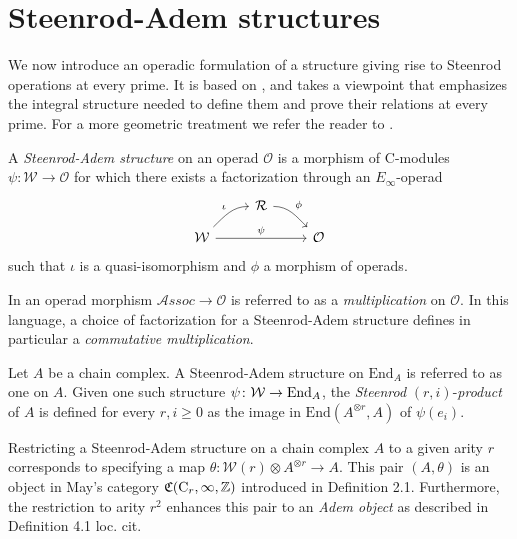 
\section{Steenrod-Adem structures}

We now introduce an operadic formulation of a structure giving rise to Steenrod operations at every prime. It is based on \cites{steenrod47products, steenrod53symmetric, steenrod53cyclic, may70generalapproach}, and takes a viewpoint that emphasizes the integral structure needed to define them and prove their relations at every prime. For a more geometric treatment we refer the reader to \cites{may72geometry, may76homology, lawson2020n}.

\begin{definition} \label{def: Steenrod-Adem structure}
	A \textit{Steenrod-Adem structure} on an operad $\mathcal O$ is a 
	morphism of $\mathrm{C}$-modules $\psi \colon \mathcal W \to \mathcal O$ for which there exists a factorization through an $E_\infty$-operad
	\begin{equation*}
	\begin{tikzcd}[column sep = normal, row sep = small]
	& \mathcal R \arrow[dr, "\phi", out=0] & \\
	\mathcal W \arrow[ur, "\iota", in=180] \arrow[rr, "\psi"] & & \mathcal O
	\end{tikzcd}
	\end{equation*}
	such that $\iota$ is a quasi-isomorphism and $\phi$ a morphism of operads.
\end{definition}

\begin{remark} \label{rmk: Deligne conjecture}
	In \cite{GerstenhaberVoronov} an operad morphism $\mathcal{A}ssoc \to \mathcal O$ is referred to as a \textit{multiplication} on $\mathcal O$. In this language, a choice of factorization for a Steenrod-Adem structure defines in particular a \textit{commutative multiplication}.
\end{remark}

\begin{definition}
	Let $A$ be a chain complex. A Steenrod-Adem structure on $\mathrm{End}_A$ is referred to as one on $A$. Given one such structure $\psi \colon \mathcal W \to \mathrm{End}_A$, the \textit{Steenrod} $(r, i)$-\textit{product} of $A$ is defined for every $r, i \geq 0$ as the image in $ \mathrm{End}(A^{\otimes r}, A)$ of $\psi(e_i)$.
\end{definition}

\begin{remark}
	Restricting a Steenrod-Adem structure on a chain complex $A$ to a given arity $r$ corresponds to specifying a map $\theta \colon \mathcal W(r) \otimes A^{\otimes r} \to A$. This pair $(A, \theta)$ is an object in May's category $\mathfrak{C}(\mathrm C_r, \infty, \mathbb{Z})$ introduced in \cite{may70generalapproach} Definition 2.1. Furthermore, the restriction to arity $r^2$ enhances this pair to an \textit{Adem object} as described in Definition 4.1 loc. cit.
\end{remark}


